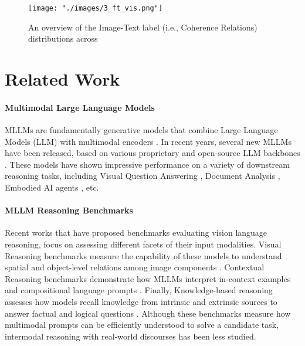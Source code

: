 \begin{figure*}
    \centering
    \texttt{[image: "./images/3\_ft\_vis.png"]}
    \caption{An overview of the Image-Text label (i.e., Coherence Relations) distributions across {\name}}
    \label{fig:data_dist}
\end{figure*}

\section{Related Work}

\paragraph{Multimodal Large Language Models}
MLLMs are fundamentally generative models that combine Large Language Models (LLM) \cite{Brown2020-hw} with multimodal encoders \cite{Dosovitskiy2021-hj}. In recent years, several new MLLMs have been released, based on various proprietary \cite{OpenAI2024-hr, AnthropicUnknown-hu, Pichai2024-xj} and open-source LLM backbones \cite{Liu2023-os, Wu2024-ip, Bai2023-lu}. These models have shown impressive performance on a variety of downstream reasoning tasks, including Visual Question Answering \cite{Wu2024-pq}, Document Analysis \cite{Lv2023-ex}, Embodied AI agents \cite{Shek2024-dx}, etc. 


\paragraph{MLLM Reasoning Benchmarks}
Recent works that have proposed benchmarks evaluating vision language reasoning, focus on assessing different facets of their input modalities. Visual Reasoning benchmarks measure the capability of these models to understand spatial and object-level relations among image components \cite{Kamath2023-ls, Rajabi2024-sa, Nie2024-nv, Thrush2022-yf, Kamoi2024-fc}. Contextual Reasoning benchmarks demonstrate how MLLMs interpret in-context examples and compositional language prompts \cite{Zong2024-xa, Wu2024-pq, Shao2024-jq, Zeng2024-sp}. Finally, Knowledge-based reasoning assesses how models recall knowledge from intrinsic and extrinsic sources to answer factual and logical questions \cite{Johnson2016-ut, Xenos2023-gz, Lu2022-aw}. Although these benchmarks measure how multimodal prompts can be efficiently understood to solve a candidate task, intermodal reasoning with real-world discourses has been less studied. 


